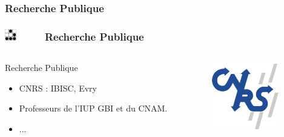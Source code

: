 \documentclass[slidetop,11pt]{beamer}
\def\sectionPartIIbDE{Recherche Publique}
\def\moreInFrameTitle{\includegraphics[height=0.5cm]{img/logo_glider.png}~~~~~}
\begin{document}
\subsubsection{\sectionPartIIbDE}
\begin{frame}
	\frametitle{\moreInFrameTitle \sectionPartIIbDE}
	\begin{columns}[T]
	\begin{column}[T]{7cm}
		\begin{beamerboxesrounded}	[lower=substructureUN, %
		 				 upper=block title UN,%
						 shadow=true]%
		       {\sectionPartIIbDE}
			\begin{itemize}
				\item CNRS : IBISC, Evry
				\item Professeurs de l'IUP GBI et du CNAM. 
				\item ...
			\end{itemize}
		\end{beamerboxesrounded}
	\end{column}
	\begin{column}[T]{3cm}
		\includegraphics[height=3cm]{img/logo_cnrs.png}
	\end{column}
	\end{columns}
\end{frame}
\end{document}
